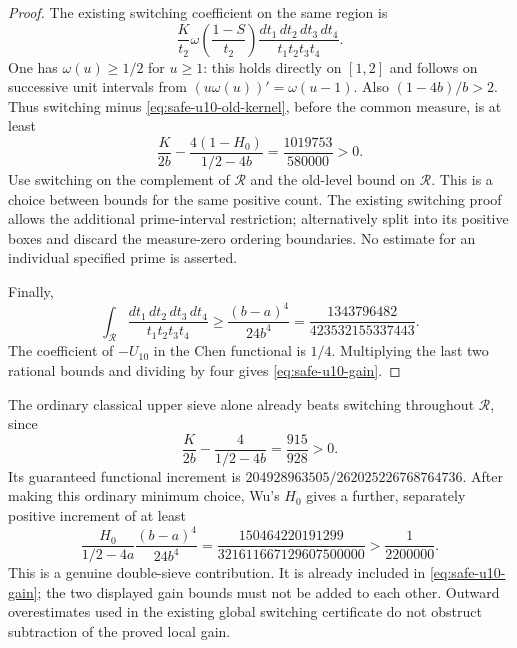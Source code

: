 \documentclass[11pt]{article}
\begin{document}
\begin{proof}
The existing switching coefficient on the same region is
\[
 \frac{K}{t_2}\omega\left(\frac{1-S}{t_2}\right)
       \frac{dt_1\,dt_2\,dt_3\,dt_4}{t_1t_2t_3t_4}.
\]
One has $\omega(u)\ge1/2$ for $u\ge1$: this holds directly on
$[1,2]$ and follows on successive unit intervals from
$(u\omega(u))'=\omega(u-1)$.  Also $(1-4b)/b>2$.
Thus switching minus \eqref{eq:safe-u10-old-kernel}, before the common
measure, is at least
\[
 \frac{K}{2b}-\frac{4(1-H_0)}{1/2-4b}
   =\frac{1019753}{580000}>0.
\]
Use switching on the complement of $\mathcal R$ and the old-level
bound on $\mathcal R$.  This is a choice between bounds for the same
positive count.  The existing switching proof allows the additional
prime-interval restriction; alternatively split into its positive
boxes and discard the measure-zero ordering boundaries.
No estimate for an individual specified prime is asserted.

Finally,
\[
 \int_{\mathcal R}\frac{dt_1\,dt_2\,dt_3\,dt_4}{t_1t_2t_3t_4}
 \ge\frac{(b-a)^4}{24b^4}
 =\frac{1343796482}{423532155337443}.
\]
The coefficient of $-U_{10}$ in the Chen functional is $1/4$.
Multiplying the last two rational bounds and dividing by four
gives \eqref{eq:safe-u10-gain}.
\end{proof}

The ordinary classical upper sieve alone already beats switching
throughout $\mathcal R$, since
\[
 \frac{K}{2b}-\frac4{1/2-4b}=\frac{915}{928}>0.
\]
Its guaranteed functional increment is
$204928963505/262025226768764736$.
After making this ordinary minimum choice, Wu's $H_0$ gives a
further, separately positive increment of at least
\[
 \frac{H_0}{1/2-4a}\frac{(b-a)^4}{24b^4}
 =\frac{150464220191299}{321611667129607500000}
 >\frac1{2200000}.
\]
This is a genuine double-sieve contribution.  It is already included
in \eqref{eq:safe-u10-gain}; the two displayed gain bounds must not
be added to each other.  Outward overestimates used in the existing
global switching certificate do not obstruct subtraction of the
proved local gain.
\end{document}

